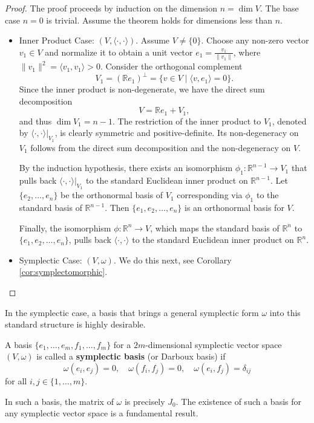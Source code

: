 \begin{proof}
The proof proceeds by induction on the dimension $n = \dim V$. The base case $n=0$ is trivial. Assume the theorem holds for dimensions less than $n$.
\begin{itemize}
    \item Inner Product Case: $(V, \langle \cdot, \cdot \rangle)$. Assume $V \neq \{0\}$. Choose any non-zero vector $v_1 \in V$ and normalize it to obtain a unit vector $e_1 = \frac{v_1}{\|v_1\|}$, where $\|v_1\|^2 = \langle v_1, v_1 \rangle > 0$. Consider the orthogonal complement
    \[
    V_1 = (\mathbb{R} e_1)^\perp = \{ v \in V \mid \langle v, e_1 \rangle = 0 \}.
    \]
    Since the inner product is non-degenerate, we have the direct sum decomposition
    \[
    V = \mathbb{R} e_1 + V_1,
    \]
    and thus $\dim V_1 = n - 1$. The restriction of the inner product to $V_1$, denoted by $\langle \cdot, \cdot \rangle|_{V_1}$, is clearly symmetric and positive-definite. Its non-degeneracy on $V_1$ follows from the direct sum decomposition and the non-degeneracy on $V$.
    
    By the induction hypothesis, there exists an isomorphism $\phi_1: \mathbb{R}^{n-1} \to V_1$ that pulls back $\langle \cdot, \cdot \rangle|_{V_1}$ to the standard Euclidean inner product on $\mathbb{R}^{n-1}$. Let $\{e_2, \dots, e_n\}$ be the orthonormal basis of $V_1$ corresponding via $\phi_1$ to the standard basis of $\mathbb{R}^{n-1}$. Then $\{e_1, e_2, \dots, e_n\}$ is an orthonormal basis for $V$.
    
    Finally, the isomorphism $\phi: \mathbb{R}^n \to V$, which maps the standard basis of $\mathbb{R}^n$ to $\{e_1, e_2, \dots, e_n\}$, pulls back $\langle \cdot, \cdot \rangle$ to the standard Euclidean inner product on $\mathbb{R}^n$.
    
    \item Symplectic Case: $(V, \omega)$. We do this next, see Corollary \ref{cor:symplectomorphic}.
    
\end{itemize}
\end{proof}

In the symplectic case, a basis that brings a general symplectic form $\omega$ into this standard structure is highly desirable.
\begin{definition} \label{def:symplectic_basis}
A basis $\{ e_1, \dots, e_m, f_1, \dots, f_m \}$ for a $2m$-dimensional symplectic vector space $(V, \omega)$ is called a \textbf{symplectic basis} (or Darboux basis) if
\[
\omega(e_i, e_j) = 0, \quad \omega(f_i, f_j) = 0, \quad \omega(e_i, f_j) = \delta_{ij}
\]
for all $i, j \in \{1, \dots, m\}$.
\end{definition}
In such a basis, the matrix of $\omega$ is precisely $J_0$. The existence of such a basis for any symplectic vector space is a fundamental result.

